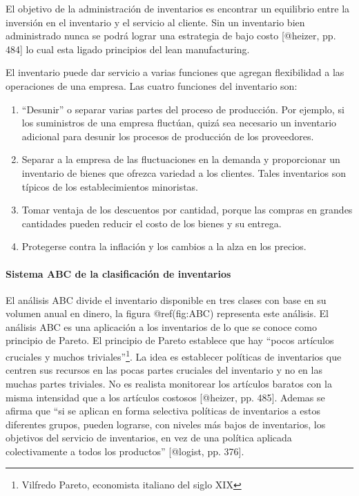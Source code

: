 \documentclass[
]{article}
\providecommand{\tightlist}{%
  \setlength{\itemsep}{0pt}\setlength{\parskip}{0pt}}
\begin{document}
El objetivo de la administración de inventarios es encontrar un
equilibrio entre la inversión en el inventario y el servicio al cliente.
Sin un inventario bien administrado nunca se podrá lograr una estrategia
de bajo costo {[}@heizer, pp. 484{]} lo cual esta ligado principios del
lean manufacturing.

El inventario puede dar servicio a varias funciones que agregan
flexibilidad a las operaciones de una empresa. Las cuatro funciones del
inventario son:

\begin{enumerate}
\def\labelenumi{\arabic{enumi}.}
\tightlist
\item
  ``Desunir'' o separar varias partes del proceso de producción. Por
  ejemplo, si los suministros de una empresa fluctúan, quizá sea
  necesario un inventario adicional para desunir los procesos de
  producción de los proveedores.
\item
  Separar a la empresa de las fluctuaciones en la demanda y proporcionar
  un inventario de bienes que ofrezca variedad a los clientes. Tales
  inventarios son típicos de los establecimientos minoristas.
\item
  Tomar ventaja de los descuentos por cantidad, porque las compras en
  grandes cantidades pueden reducir el costo de los bienes y su entrega.
\item
  Protegerse contra la inflación y los cambios a la alza en los precios.
\end{enumerate}

\hypertarget{sistema-abc-de-la-clasificaciuxf3n-de-inventarios}{%
\paragraph{Sistema ABC de la clasificación de
inventarios}\label{sistema-abc-de-la-clasificaciuxf3n-de-inventarios}}

El análisis ABC divide el inventario disponible en tres clases con base
en su volumen anual en dinero, la figura @ref(fig:ABC) representa este
análisis. El análisis ABC es una aplicación a los inventarios de lo que
se conoce como principio de Pareto. El principio de Pareto establece que
hay ``pocos artículos cruciales y muchos triviales''\footnote{Vilfredo
  Pareto, economista italiano del siglo XIX}. La idea es establecer
políticas de inventarios que centren sus recursos en las pocas partes
cruciales del inventario y no en las muchas partes triviales. No es
realista monitorear los artículos baratos con la misma intensidad que a
los artículos costosos {[}@heizer, pp. 485{]}. Ademas se afirma que ``si
se aplican en forma selectiva políticas de inventarios a estos
diferentes grupos, pueden lograrse, con niveles más bajos de
inventarios, los objetivos del servicio de inventarios, en vez de una
política aplicada colectivamente a todos los productos'' {[}@logist, pp.
376{]}.
\end{document}
